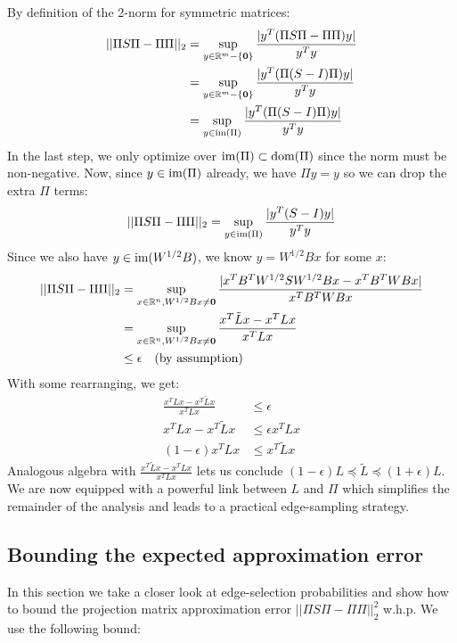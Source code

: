 \documentclass{article}
\begin{document}
\noindent
By definition of the 2-norm for symmetric matrices:
\begin{align*}
    ||\Pi S\Pi - \Pi\Pi||_2 &= \sup_{y \in \mathbb{R}^m - \{\mathbf{0}\}} \frac{|y^T(\Pi
    S\Pi - \Pi\Pi)y|}{y^Ty} \\
                            &= \sup_{y \in \mathbb{R}^m - \{\mathbf{0}\}} \frac{|y^T(\Pi
    (S - I)\Pi)y|}{y^Ty} \\
                            &= \sup_{y \in \text{im}(\Pi)} \frac{|y^T(\Pi
    (S - I)\Pi)y|}{y^Ty}
\end{align*}
In the last step, we only optimize over $\text{im}(\Pi) \subset \text{dom}(\Pi)$
since the norm must be non-negative. Now, since $y \in \text{im}(\Pi)$ already, we
have $\Pi y = y$ so we can drop the extra $\Pi$ terms:
\begin{align*}
    ||\Pi S\Pi - \Pi\Pi||_2 = \sup_{y \in \text{im}(\Pi)} \frac{|y^T(S -
    I)y|}{y^Ty}
\end{align*}
Since we also have $y \in \text{im}(W^{1/2}B)$, we know $y = W^{1/2}Bx$ for some
$x$:
\begin{align*}
    ||\Pi S\Pi - \Pi\Pi||_2 &= \sup_{x \in \mathbb{R}^n, W^{1/2}Bx \not= \mathbf{0}}
    \frac{|x^TB^TW^{1/2}SW^{1/2}Bx - x^TB^TWBx|}{x^TB^TWBx} \\
    &= \sup_{x \in \mathbb{R}^n, W^{1/2}Bx \not= \mathbf{0}} \frac{x^T\tilde{L}x -
x^TLx}{x^TLx} \\
    &\leq \epsilon \quad \text{(by assumption)}
\end{align*}
With some rearranging, we get:
\begin{align*}
    \frac{x^TLx - x^T\tilde{L}x}{x^TLx} &\leq \epsilon \\
    x^TLx - x^T\tilde{L}x &\leq \epsilon x^TLx \\
    (1 - \epsilon)x^TLx &\leq x^T\tilde{L}x
\end{align*}
Analogous algebra with $\frac{x^T\tilde{L}x - x^TLx}{x^TLx}$ lets us
conclude $(1-\epsilon)L \preceq \tilde{L} \preceq (1+\epsilon)L$. We are now
equipped with a powerful link between $L$ and $\Pi$ which simplifies the
remainder of the analysis and leads to a practical edge-sampling strategy.

\subsection{Bounding the expected approximation error}

In this section we take a closer look at edge-selection probabilities and
show how to bound the projection matrix approximation error $||\Pi S \Pi -
\Pi\Pi||^2_2$ w.h.p. We use the following bound: \\
\end{document}
